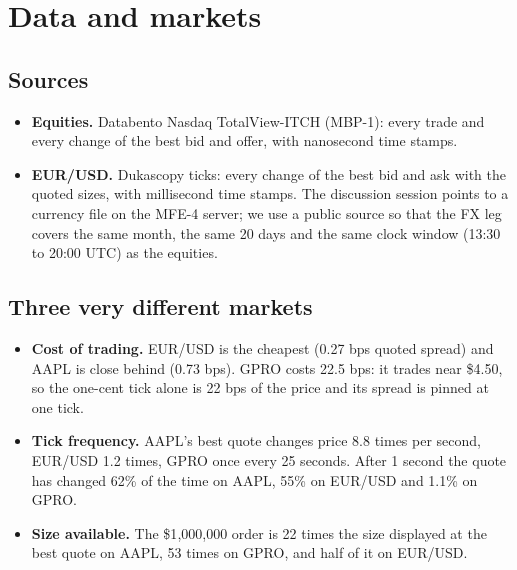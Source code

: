 \documentclass[11pt]{article}
\begin{document}
\section{Data and markets}
\label{sec:data}

\subsection{Sources}

\begin{itemize}
  \item \textbf{Equities.} Databento Nasdaq TotalView-ITCH (MBP-1): every trade
        and every change of the best bid and offer, with nanosecond time stamps.
  \item \textbf{EUR/USD.} Dukascopy ticks: every change of the best bid and ask
        with the quoted sizes, with millisecond time stamps. The discussion
        session points to a currency file on the MFE-4 server; we use a public
        source so that the FX leg covers the same month, the same 20 days and the
        same clock window (13:30 to 20:00 UTC) as the equities.
\end{itemize}

\subsection{Three very different markets}

\begin{table}[H]
  \centering
  \small
  \caption{The three markets, regular-session averages (units: shares or euros).}
  \label{tab:markets}
  
\end{table}

\begin{itemize}
  \item \textbf{Cost of trading.} EUR/USD is the cheapest (0.27 bps quoted
        spread) and AAPL is close behind (0.73 bps). GPRO costs 22.5 bps: it
        trades near \$4.50, so the one-cent tick alone is 22 bps of the price and
        its spread is pinned at one tick.
  \item \textbf{Tick frequency.} AAPL's best quote changes price 8.8 times per
        second, EUR/USD 1.2 times, GPRO once every 25 seconds. After 1 second the
        quote has changed 62\% of the time on AAPL, 55\% on EUR/USD and 1.1\% on
        GPRO.
  \item \textbf{Size available.} The \$1{,}000{,}000 order is 22 times the size
        displayed at the best quote on AAPL, 53 times on GPRO, and half of it on
        EUR/USD.
\end{itemize}
\end{document}
